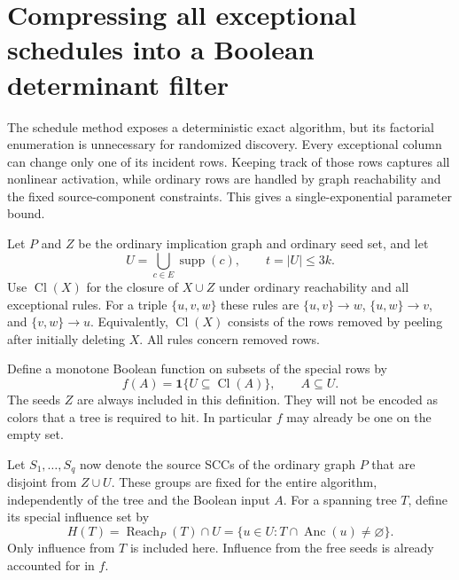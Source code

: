 \section{Compressing all exceptional schedules into a Boolean determinant filter}
\label{sec:special-row-sieve}

The schedule method exposes a deterministic exact algorithm, but its
factorial enumeration is unnecessary for randomized discovery.  Every
exceptional column can change only one of its incident rows.  Keeping track
of those rows captures all nonlinear activation, while ordinary rows are
handled by graph reachability and the fixed source-component constraints.
This gives a single-exponential parameter bound.

Let $P$ and $Z$ be the ordinary implication graph and ordinary seed set,
and let
\[
             U=\bigcup_{c\in E}\operatorname{supp}(c),
             \qquad t=|U|\leq3k.
\]
Use $\operatorname{Cl}(X)$ for the closure of $X\cup Z$ under ordinary
reachability and all exceptional rules.  For a triple $\{u,v,w\}$ these
rules are $\{u,v\}\to w$, $\{u,w\}\to v$, and $\{v,w\}\to u$.
Equivalently, $\operatorname{Cl}(X)$ consists of the rows removed by
peeling after initially deleting $X$.  All rules concern removed rows.

Define a monotone Boolean function on subsets of the special rows by
\begin{equation}\label{eq:special-truth}
             f(A)=\mathbf 1\{U\subseteq\operatorname{Cl}(A)\},
                    \qquad A\subseteq U.
\end{equation}
The seeds $Z$ are always included in this definition.  They will not be
encoded as colors that a tree is required to hit.  In particular $f$ may
already be one on the empty set.

Let $S_1,\ldots,S_q$ now denote the source SCCs of the ordinary graph $P$
that are disjoint from $Z\cup U$.  These groups are fixed for the entire
algorithm, independently of the tree and the Boolean input $A$.
For a spanning tree $T$, define its special influence set by
\begin{equation}\label{eq:special-influence}
        H(T)=\operatorname{Reach}_P(T)\cap U
             =\{u\in U:T\cap\operatorname{Anc}(u)\ne\varnothing\}.
\end{equation}
Only influence from $T$ is included here.  Influence from the free seeds
is already accounted for in $f$.

